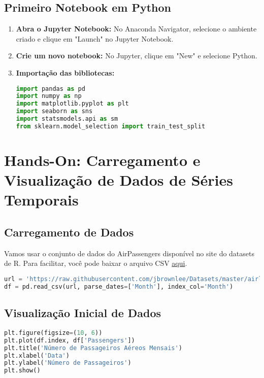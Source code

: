 \subsection{Primeiro Notebook em Python}
\begin{enumerate}
    \item \textbf{Abra o Jupyter Notebook:}
    No Anaconda Navigator, selecione o ambiente criado e clique em "Launch" no Jupyter Notebook.
    \item \textbf{Crie um novo notebook:}
    No Jupyter, clique em "New" e selecione Python.
    \item \textbf{Importação das bibliotecas:}
\begin{lstlisting}[language=Python]
import pandas as pd
import numpy as np
import matplotlib.pyplot as plt
import seaborn as sns
import statsmodels.api as sm
from sklearn.model_selection import train_test_split
\end{lstlisting}
\end{enumerate}

\section{Hands-On: Carregamento e Visualização de Dados de Séries Temporais}

\subsection{Carregamento de Dados}
Vamos usar o conjunto de dados do AirPassengers disponível no site do datasets de R. Para facilitar, você pode baixar o arquivo CSV \href{https://raw.githubusercontent.com/jbrownlee/Datasets/master/airline-passengers.csv}{aqui}.

\begin{lstlisting}[language=Python]
url = 'https://raw.githubusercontent.com/jbrownlee/Datasets/master/airline-passengers.csv'
df = pd.read_csv(url, parse_dates=['Month'], index_col='Month')
\end{lstlisting}

\subsection{Visualização Inicial de Dados}
\begin{lstlisting}[language=Python]
plt.figure(figsize=(10, 6))
plt.plot(df.index, df['Passengers'])
plt.title('Número de Passageiros Aéreos Mensais')
plt.xlabel('Data')
plt.ylabel('Número de Passageiros')
plt.show()
\end{lstlisting}

